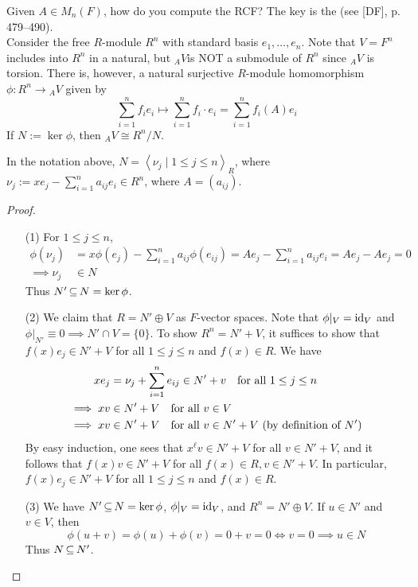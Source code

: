 \documentclass[11pt]{book}
\theoremstyle{definition}   \newtheorem{defn}[counter]{Definition} %
\newcommand{\gen}[1]{\left\langle #1 \right\rangle}   \newcommand{\stab}[2]{\tn{Stab}_{#1}(#2)}   \newcommand{\fix}[2]{\tn{Fix}_{#1}(#2)}   \newcommand{\op}{^{\tn{op}}}
\DeclareMathOperator{\ra}{\rightarrow}   \DeclareMathOperator{\Poly}{\mathbf{P}}   \DeclareMathOperator{\spn}{\textnormal{span}}   \DeclareMathOperator{\aut}{\textnormal{Aut}}
\numberwithin{counter}{chapter}
\begin{document}
\noindent {} Given $A \in M_n(F)$, how do you compute the RCF? The key is the  (see [DF], p. 479--490). \\

Consider the free $R$-module $R^n$ with standard basis $e_1,\dots,e_n$. Note that $V = F^n$ includes into $R^n$ in a natural, but ${_AV}$is NOT a submodule of $R^n$ since ${_AV}$ is torsion. There is, however, a natural surjective $R$-module homomorphism $\phi : R^n \ra {_AV}$ given by
	\[\sum_{i=1}^n f_i e_i \mapsto \sum_{i=1}^n f_i \cdot e_i = \sum_{i=1}^n f_i(A) e_i \]
If $N := \ker \phi$, then ${_AV} \cong R^n/N$. 

\begin{lemma}[Exercises 22--25 on p. 491 in {[DF]} ]
In the notation above, $N = \gen{\nu_j \mid 1 \leq j \leq n}_R$, where $\nu_j := xe_j - \sum_{i=1}^n a_{ij} e_i \in R^n$, where $A = (a_{ij})$.
\end{lemma}

\begin{proof}\ 
\begin{enumerate}
\item[(1)] For $1 \leq j \leq n$,
	\begin{align*}
	\phi(\nu_j) &= x \phi(e_j) - \sum_{i=1}^n a_{ij} \phi(e_{ij}) = Ae_j - \sum_{i=1}^n a_{ij} e_i = Ae_j - Ae_j = 0 \\
	\implies \nu_j &\in N
	\end{align*}
Thus $N' \operatorname{\subseteq} N = \ker \phi$.
\item[(2)] We claim that $R = N' \oplus V$ as $F$-vector spaces. Note that $\phi|_V = \textnormal{id}_V$ and $\phi|_{N'} \equiv 0 \implies N' \cap V = \{0\}$. To show $R^n = N' + V$, it suffices to show that $f(x) e_j \in N' + V$ for all $1 \leq j \leq n$ and $f(x) \in R$. We have
\begin{align*}
x e_j &= \nu_j + \sum_{i=1}^n e_{ij} \in N' + v \quad \textnormal{for all } 1 \leq j \leq n \\
\implies x v &\in N' + V \quad \textnormal{for all } v \in V \\
\implies xv &\in N' + V \quad \textnormal{for all } v \in N' + V \textnormal{ (by definition of $N'$)}
\end{align*}
By easy induction, one sees that $x^\ell v \in N' + V$ for all $v \in N' + V$, and it follows that $f(x) v \in N' + V$ for all $f(x) \in R, v \in N' + V$. In particular, $f(x) e_j \in N' + V$ for all $1 \leq j \leq n$ and $f(x) \in R$. 

\item[(3)] We have $N' \operatorname{\subseteq} N = \ker \phi$, $\phi|_V = \textnormal{id}_V$, and $R^n = N' \oplus V$. If $u \in N'$ and $v \in V$, then
	\[\phi(u + v) = \phi(u) + \phi(v) = 0 + v = 0 \iff v = 0 \implies u \in N \]
Thus $N \operatorname{\subseteq} N'$.  
\end{enumerate}
\end{proof}
\end{document}
